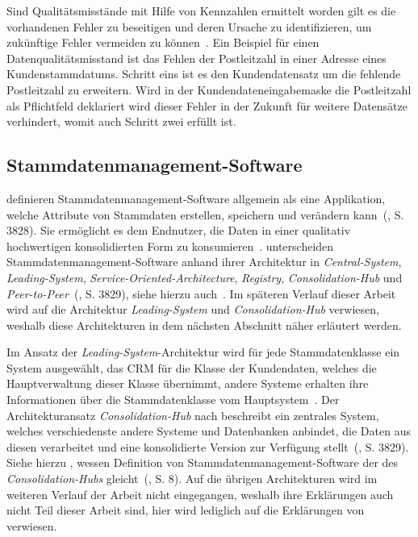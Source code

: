 \documentclass[
  language=german, %
  type=bachelor%
]{isthesis}
\begin{document}
\begin{content}
	Sind Qualitätsmisstände mit Hilfe von Kennzahlen ermittelt worden gilt es die
	vorhandenen Fehler zu beseitigen und deren Ursache zu identifizieren, um
	zukünftige Fehler vermeiden zu können~\cite[][S. 22]{eckerson2002data}. Ein
	Beispiel für einen Datenqualitätsmisstand ist das Fehlen der Postleitzahl in
	einer Adresse eines Kundenstammdatums. Schritt eins ist es den
	Kundendatensatz um die fehlende Postleitzahl zu erweitern. Wird in der
	Kundendateneingabemaske die Postleitzahl als Pflichtfeld deklariert wird
	dieser Fehler in der Zukunft für weitere Datensätze verhindert, womit auch
	Schritt zwei erfüllt ist.

	\subsection{Stammdatenmanagement-Software}
	\textsc{\citeauthor{baghi2014toward}} definieren
	Stammdatenmanagement-Software allgemein als eine Applikation, welche
  Attribute von Stammdaten erstellen, speichern und verändern kann~(\citeyear{baghi2014toward}, S. 3828).  Sie
	ermöglicht es dem Endnutzer, die Daten in einer qualitativ hochwertigen
	konsolidierten Form zu konsumieren~\cite[][Abschnitt
	1.2.]{dreibelbis2008enterprise}.  \textsc{\citeauthor{baghi2014toward}}
	unterscheiden Stammdatenmanagement-Software anhand ihrer Architektur in
	\textit{Central-System}, \textit{Leading-System},
	\textit{Service-Oriented-Architecture}, \textit{Registry},
  \textit{Consolidation-Hub} und \textit{Peer-to-Peer}~(\citeyear{baghi2014toward}, S. 3829), siehe hierzu auch~\cite[][Abschnitt
	5.3.1.]{dreibelbis2008enterprise}. Im späteren Verlauf dieser Arbeit wird auf
	die Architektur \textit{Leading-System} und \textit{Consolidation-Hub}
	verwiesen, weshalb diese Architekturen in dem nächsten Abschnitt näher
	erläutert werden.
	
	Im Ansatz der \textit{Leading-System}-Architektur wird für jede
	Stammdatenklasse ein System ausgewählt, \zB{} das \acrshort{CRM} für die
	Klasse der Kundendaten, welches die Hauptverwaltung dieser Klasse übernimmt,
	andere Systeme erhalten ihre Informationen über die Stammdatenklasse vom
	Hauptsystem~\cite[][S. 3829]{baghi2014toward}. Der Architekturansatz
	\textit{Consolidation-Hub} nach \textsc{\citeauthor{baghi2014toward}}
	beschreibt ein zentrales System, welches verschiedenste andere Systeme und
	Datenbanken anbindet, die Daten aus diesen verarbeitet und eine konsolidierte
  Version zur Verfügung stellt~(\citeyear{baghi2014toward}, S. 3829). Siehe hierzu
	\textsc{\citeauthor{loshin2010master}}, wessen Definition von
	Stammdatenmanagement-Software der des \textit{Consolidation-Hubs}
  gleicht~(\citeyear{loshin2010master}, S. 8). Auf die übrigen Architekturen wird
	im weiteren Verlauf der Arbeit nicht eingegangen, weshalb ihre Erklärungen
	auch nicht Teil dieser Arbeit sind, hier wird lediglich auf die Erklärungen
	von~\cite{baghi2014toward} verwiesen.



\end{content}
\end{document}
